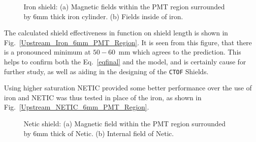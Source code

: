 \documentclass[12pt]{article}
\begin{document}
\begin{figure}[ht]
\centering
{}
\qquad
{}
\caption{\small{Iron shield: 
(a) Magnetic fields within the 
PMT region surrounded by 6mm thick iron cylinder. 
(b) Fields inside  of iron.}
\label{Upstream_SingleIron_6mm}}
\end{figure}
%
%
The calculated  shield  effectiveness  in function on shield length is shown in
Fig.~\ref{Upstream_Iron_6mm_PMT_Region}. It is  seen from this figure,
that there is a pronounced minimum 
at $50-60$~mm which agrees   
to the prediction. This helps to confirm both  the Eq.~\ref{eqfinal} and the model, 
and is certainly cause for further study, as well as aiding in the 
designing of the {\tt CTOF} Shields. 

Using higher saturation NETIC provided some  better  performance over the use of iron
and NETIC was thus tested in place
of the iron, as shown in Fig.~\ref{Upstream_NETIC_6mm_PMT_Region}.
%
\begin{figure}[ht]
\centering
{}
\qquad
{}
\caption{\small{Netic  shield: (a) Magnetic field within the  PMT region
 surrounded by 6mm thick of Netic. (b) Internal  field of Netic.}}
\label{Upstream_SingleNETIC_6mm}
\end{figure}   
%
\end{document}
